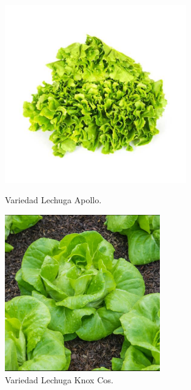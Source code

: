 \begin{figure}[ht!]
    \centering

    \begin{minipage}[b]{0.45\textwidth}
        \centering
        \includegraphics[width=0.7\textwidth]{img/lechuga_apollo.png}
        \caption{Variedad Lechuga Apollo.}
        \label{fig:apollo}
    \end{minipage}
    \hfill
    \begin{minipage}[b]{0.45\textwidth}
        \centering
        \includegraphics[width=0.6\textwidth]{img/lechuga_knox.png}
        \caption{Variedad Lechuga Knox Cos.}
        \label{fig:knox}
    \end{minipage}

\end{figure}

